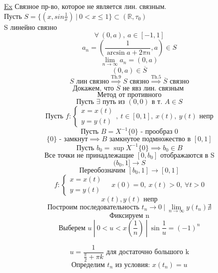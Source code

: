 \documentclass[a4paper]{article}
\begin{document}
\underline{Ex} Связное пр-во, которое не является лин. связным.\\
Пусть $ S = \{ (x, sin \frac{1}{x} ) \ | \ 0 < x \leq 1 \} \subset (\mathbb{R}, \tau_0) $ \\
S линейно связно
\[
    \forall \ (0,a), \ a \in [-1,1]
\]
\[
    a_n = \left(\frac{1}{\arcsin a + 2 \pi n}, a\right) \in S
\]
\[
    \lim_{n \to \infty} a_n = (0,a)
\]
\[
    (0,a) \in \overline{S}
\]
\[
    S \text{ лин связно} \stackrel{\text{Th.9}}{\implies} S \text{ связно} 
    \stackrel{\text{Th.5}}{\implies} \overline{S} \text{ связно}
\]
\[
\text{Докажем, что } \overline{S} \text{ не явз лин. связным }
\]
\[
    \text{Метод от противного}
\]
\[
    \text{Пусть } \exists \text{ путь из } (0,0) \text{ в т. } A \in S
\]
\[
    \text{Пусть } f: \begin{cases}
        x = x(t)\\
        y = y(t)
    \end{cases}, \  t \in [0,1], \ x(t), \ y(t) \text{ непр}
\]
\[
    \text{Пусть } B = X^{-1}\{0\} \text{ - прообраз 0}
\]
\[
    \{ 0 \} \text{ - замкнут} \implies B \text{ замкнутое подмножество в } [0,1]
\]
\[
    \text{Пусть } b_0 = \sup X^{-1} \{0\} \implies b_0 \in B
\]
\[
    \text{Все точки не принадлежащие }[0,b_0] \text{ отображаются в S}
\]
\[
    (b_0, 1] \longrightarrow S
\]
\[
    \text{Переобозначим } [b_0, 1] \longrightarrow [0,1]
\]
\[
    f: \begin{cases}
        x = x(t)\\
        y = y(t)
    \end{cases}
    \quad x(0) = 0, \ x(t) > 0, \ \forall t > 0
\]
\[
    x(t), y(t) \text{ непр}
\]
\[
    \text{Построим последовательность } t_n \to 0 \ | \ \lim_{n \to \infty} y(t_n)
    \nexists
\]
\[
    \text{Фиксируем n}
\]
\[
    \text{Выберем } u \ | \ 0 < u < x(\frac{1}{n}) \ | \ \sin \frac{1}{u} = 
    (-1)^{n}
\]

\[
    u = \frac{1}{\frac{\pi}{2} + \pi k} \text{ для достаточно большого k} 
\]
\[
    \text{Определим } t_n \text{ из условия: } x(t_n) = u
\]
\end{document}
